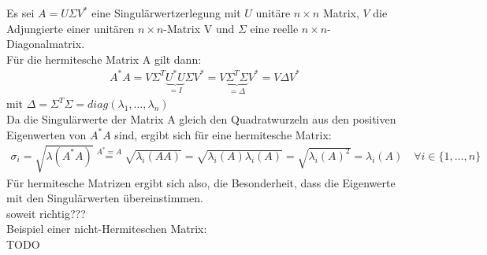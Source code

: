 Es sei $A=U\Sigma V^*$ eine Singulärwertzerlegung mit $U$ unitäre $n\times n$ Matrix, $V$ die Adjungierte einer unitären $n\times n$-Matrix V und $\Sigma$ eine reelle $n\times n$-Diagonalmatrix.\\
Für die hermitesche Matrix A gilt dann:
\begin{align*}
A^*A=V\Sigma^T\underbrace{U^*U}_{=I}\Sigma V^* = V\underbrace{\Sigma^T\Sigma}_{=\Delta}V^*=V\Delta V^*
\end{align*}
mit $\Delta=\Sigma^T \Sigma=diag(\lambda_1,\ldots,\lambda_n)$\\
\newline
Da die Singulärwerte der Matrix A gleich den Quadratwurzeln aus den positiven Eigenwerten von $A^*A$ sind, ergibt sich für eine hermitesche Matrix:
\begin{align*}
	\sigma_i=\sqrt{\lambda(A^*A)} \overset{A^*=A}{=} \sqrt{\lambda_i(AA)}=\sqrt{\lambda_i(A)\lambda_i(A)}=\sqrt{\lambda_i(A)^2}=\lambda_i(A) \quad \forall i\in\{1,\ldots,n\}
\end{align*}
Für hermitesche Matrizen ergibt sich also, die Besonderheit, dass die Eigenwerte mit den Singulärwerten übereinstimmen.\\
soweit richtig???\\
\newline
Beispiel einer nicht-Hermiteschen Matrix:\\
TODO\\